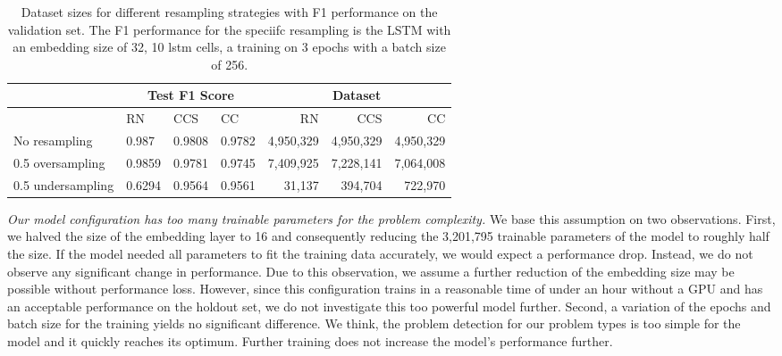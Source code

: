 \begin{table}[]
    \tabcolsep=0.11cm
    \begin{tabularx}{\textwidth}{lXXX|rrr}
    \toprule
                        & \multicolumn{3}{c}{Test F1 Score} & \multicolumn{3}{c}{Dataset}   \\ \midrule
                        & RN        & CCS        & CC     & RN            & CCS         & CC          \\ \midrule
    No resampling     &  0.987   &  0.9808    &  0.9782  &  4,950,329    & 4,950,329   & 4,950,329   \\
    0.5 oversampling  &  0.9859   &  0.9781   &  0.9745  &  7,409,925    & 7,228,141   & 7,064,008   \\
    0.5 undersampling &  0.6294   &  0.9564   &  0.9561  &  31,137       & 394,704     & 722,970     \\ \bottomrule
    \end{tabularx}
    \caption[Dataset sizes for different resampling strategies and performance for random forest classifier]{Dataset sizes for different resampling strategies with F1 performance on the validation set. The F1 performance for the speciifc resampling is the LSTM with an embedding size of 32, 10 lstm cells, a training on 3 epochs with a batch size of 256.}
    \label{tab:resampling_size_performance_lstm}
\end{table}


\textit{Our model configuration has too many trainable parameters for the problem complexity.} We base this assumption on two observations. First, we halved the size of the embedding layer to 16 and consequently reducing the 3,201,795 trainable parameters of the model to roughly half the size. If the model needed all parameters to fit the training data accurately, we would expect a performance drop. Instead, we do not observe any significant change in performance. Due to this observation, we assume a further reduction of the embedding size may be possible without performance loss. However, since this configuration trains in a reasonable time of under an hour without a GPU and has an acceptable performance on the holdout set, we do not investigate this too powerful model further.
Second, a variation of the epochs and batch size for the training yields no significant difference. We think, the problem detection for our problem types is too simple for the model and it quickly reaches its optimum. Further training does not increase the model's performance further. 

\begin{center}
\end{center}

